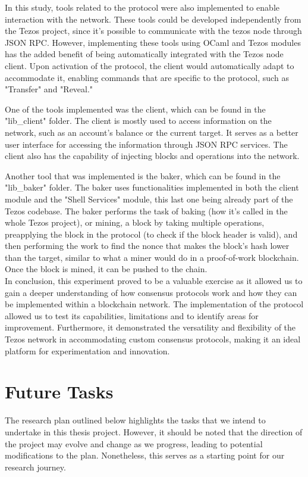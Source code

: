 In this study, tools related to the protocol were also implemented to enable interaction with the network. These tools could be developed independently from the Tezos project, since it's possible to communicate with the tezos node through JSON RPC. However, implementing these tools using OCaml and Tezos modules has the added benefit of being automatically integrated with the Tezos node client. Upon activation of the protocol, the client would automatically adapt to accommodate it, enabling commands that are specific to the protocol, such as "Transfer" and "Reveal."

One of the tools implemented was the client, which can be found in the "lib\_client" folder. The client is mostly used to access information on the network, such as an account's balance or the current target. It serves as a better user interface for accessing the information through JSON RPC services. The client also has the capability of injecting blocks and operations into the network.

Another tool that was implemented is the baker, which can be found in the "lib\_baker" folder. The baker uses functionalities implemented in both the client module and the "Shell Services" module, this last one being already part of the Tezos codebase.
The baker performs the task of baking (how it's called in the whole Tezos project), or mining, a block by taking multiple operations, preapplying the block in the protocol (to check if the block header is valid), and then performing the work to find the nonce that makes the block's hash lower than the target, similar to what a miner would do in a proof-of-work blockchain. Once the block is mined, it can be pushed to the chain.\\


In conclusion, this experiment proved to be a valuable exercise as it allowed us to gain a deeper understanding of how consensus protocols work and how they can be implemented within a blockchain network. The implementation of the protocol allowed us to test its capabilities, limitations and to identify areas for improvement. Furthermore, it demonstrated the versatility and flexibility of the Tezos network in accommodating custom consensus protocols, making it an ideal platform for experimentation and innovation.

\section{Future Tasks}

The research plan outlined below highlights the tasks that we intend to undertake in this thesis project. However, it should be noted that the direction of the project may evolve and change as we progress, leading to potential modifications to the plan. Nonetheless, this serves as a starting point for our research journey.

